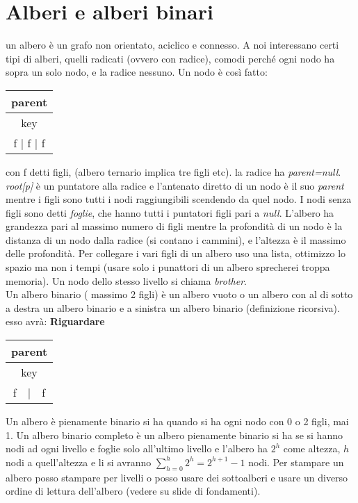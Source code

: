 \documentclass[a4paper,12pt,oneside,tikz]{book}
\begin{document}
\section{Alberi e alberi binari}
un albero è un grafo non orientato, aciclico e connesso. A noi interessano certi tipi di alberi, quelli radicati (ovvero con radice), comodi perché ogni nodo ha sopra un solo nodo, e la radice nessuno.
Un nodo è così fatto:
\begin{center}
	\begin{tabular}{|c|}
		\hline
		parent                    \\
		\hline
		key                       \\
		\hline
		f$\,\,|\,\,$f$\,\,|\,\,$f \\
		\hline
	\end{tabular}
\end{center}
con f detti figli, (albero ternario implica tre figli etc). la radice ha \textit{parent=null}. \textit{root[p]} è un puntatore alla radice e l'antenato diretto di un nodo è il suo \textit{parent} mentre i figli sono tutti i nodi raggiungibili scendendo da quel nodo. I nodi senza figli sono detti \textit{foglie}, che hanno tutti i puntatori figli pari a \textit{null}. L'albero ha grandezza pari al massimo numero di figli mentre la profondità di un nodo è la distanza di un nodo dalla radice (si contano i cammini), e l'altezza è il massimo delle profondità. Per collegare i vari figli di un albero uso una lista, ottimizzo lo spazio ma non i tempi (usare solo i punattori di un albero sprecherei troppa memoria). Un nodo dello stesso livello si chiama \textit{brother}.\\
Un albero binario ( massimo 2 figli) è un albero vuoto o un albero con al di sotto a destra un albero binario e a sinistra un albero binario (definizione ricorsiva).
esso avrà:
\textbf{Riguardare}
\begin{center}
	\begin{tabular}{|c|}
		\hline
		parent                        \\
		\hline
		key                           \\
		\hline
		f$\,\,\,\,\,\,|\,\,\,\,\,\,$f \\
		\hline
	\end{tabular}
\end{center}
Un albero è pienamente binario si ha quando si ha ogni nodo con 0 o 2 figli, mai 1. Un albero binario completo è un albero pienamente binario si ha se si hanno nodi ad ogni livello e foglie solo all'ultimo livello e l'albero ha $2^h$ come altezza, $h$ nodi a quell'altezza e li si avranno $\sum _{h=0}^h 2^h=2^{h+1}-1$ nodi.  Per stampare un albero posso stampare per livelli o posso usare dei sottoalberi e usare un diverso ordine di lettura dell'albero (vedere su slide di fondamenti).
\end{document}
